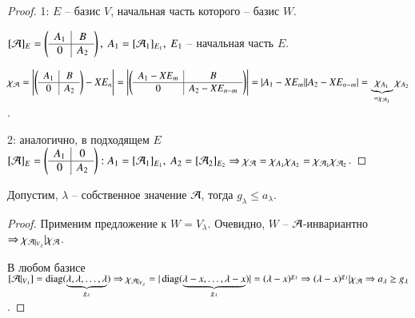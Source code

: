 \documentclass[main]{subfiles}
\begin{document}
\begin{proof}
    1: $E$ -- базис $V$, начальная часть которого -- базис $W$.

    $[\mathcal{A}]_E = \left(\begin{array}{c|c}
                A_1 & B   \\ \hline
                0   & A_2 \\
            \end{array}\right),\ A_1 = [\mathcal{A}_1]_{E_1},\ E_1$ -- начальная часть $E$.

    $\chi_{\mathcal{A} } = \left|\left(\begin{array}{c|c}
                A_1 & B   \\ \hline
                0   & A_2 \\
            \end{array}\right) - XE_n\right| = \left|\left(\begin{array}{c|c}
                A_1 - XE_m & B              \\ \hline
                0          & A_2 - XE_{n-m} \\
            \end{array}\right)\right| = |A_1 - XE_m||A_2 - XE_{n-m}| = \underbrace{\chi_{A_1}}_{=\chi_{\mathcal{A}_1}}\chi_{A_2}$.

    2: аналогично, в подходящем $E$ $[\mathcal{A}]_E = \left(\begin{array}{c|c}
                A_1 & 0   \\ \hline
                0   & A_2 \\
            \end{array}\right): A_1 = [\mathcal{A}_1]_{E_1},\  A_2 = [\mathcal{A}_2]_{E_2} \Rightarrow
        \chi_{\mathcal{A}} = \chi_{A_1}\chi_{A_2} = \chi_{\mathcal{A}_1}\chi_{\mathcal{A}_2}$.
\end{proof}

\begin{corollary}
    Допустим, $\lambda$ -- собственное значение $\mathcal{A}$, тогда $g_{\lambda} \leq a_{\lambda}$.
\end{corollary}

\begin{proof}
    Применим предложение к $W=V_{\lambda}$. Очевидно, $W$ -- $\mathcal{A}$-инвариантно
    $\Rightarrow \chi_{\mathcal{A}|_{V_{\lambda}}}|\chi_{\mathcal{A}}$.

    В любом базисе $[\mathcal{A}|_{V_{\lambda}}] = \operatorname{diag}(\underbrace{\lambda, \lambda, \ldots, \lambda}_{g_{\lambda}})
        \Rightarrow \chi_{\mathcal{A}|_{V_{\lambda}}} = |\operatorname{diag}(\underbrace{\lambda - x, \ldots, \lambda - x}_{g_{\lambda}})| =
        (\lambda - x)^{g_{\lambda}} \Rightarrow
        (\lambda - x)^{g_{\lambda}}|\chi_{\mathcal{A}} \Rightarrow a_{\lambda} \geq g_{\lambda}$.
\end{proof}
\end{document}
